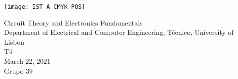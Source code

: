 
\thispagestyle {empty}

\texttt{[image: IST\_A\_CMYK\_POS]}

\begin{center}
    \vspace{1.0cm}

    \vspace{1cm}
    {\FontLb Circuit Theory and Electronics Fundamentals} \\ %
    \vspace{1cm}
    {\FontSn Department of Electrical and Computer Engineering, Técnico, University of Lisbon} \\ %
    \vspace{1cm}
    {\FontSn T4} \\
    \vspace{1cm}
    {\FontSn March 22, 2021} \\
    {\FontSn Grupo 39}
\end{center}

